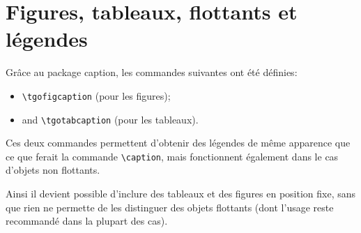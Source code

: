 \documentclass[french,ColorTheme=USAF,FontSize=10pt]{tango}
\newcommand\TO[1]{\textsf{#1}}
\begin{document}
\section{Figures, tableaux, flottants et légendes}\label{figtable}
Grâce au package \TO{caption}, les commandes suivantes ont été définies:
\begin{itemize}
\item\verb+\tgofigcaption+ (pour les figures);
\item and \verb+\tgotabcaption+ (pour les tableaux).
\end{itemize}
Ces deux commandes permettent d'obtenir des légendes de même apparence que ce que ferait la commande \verb+\caption+, mais fonctionnent également dans le cas d'objets non flottants.

Ainsi il devient possible d'inclure des tableaux et des figures en position fixe, sans que rien ne permette de les distinguer des objets flottants (dont l'usage reste recommandé dans la plupart des cas).
\end{document}
